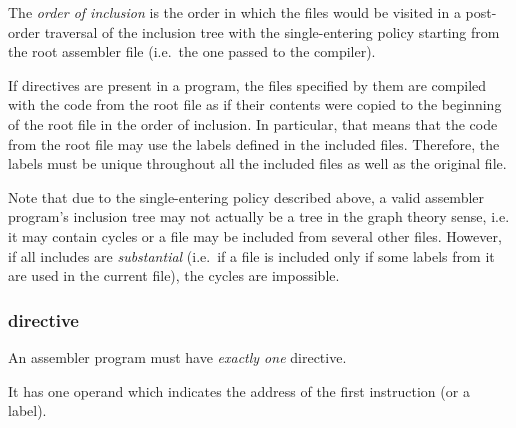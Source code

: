 The \textit{order of inclusion} is the order in which the files would be visited
in a post-order traversal of the inclusion tree with the single-entering policy 
starting from the root  assembler file
(i.e.\ the one passed to the compiler).

If  directives are present in a program, the files specified by them
are compiled with the code from the root file as if their contents were
copied to the beginning of the root file in the order of inclusion.
In particular, that means that the code from the root file may use
the labels defined in the included files.
Therefore, the labels must be unique throughout all the included files
as well as the original file.

Note that due to the single-entering policy described above, a valid 
assembler program's inclusion tree may not actually be a tree in the graph theory
sense, i.e. it may contain cycles or a file may be included from several other files.
However, if all includes are \textit{substantial} (i.e.\ if a file is included
only if some labels from it are used in the current file), the cycles are impossible.

\vspace{-0.35cm}

\hypertarget{directives:end}{
	\subsubsection{ directive}
}

\vspace{-0.2cm}

An assembler program must have \textit{exactly one}  directive.

It has one operand which indicates the address of the first instruction
(or a label).
